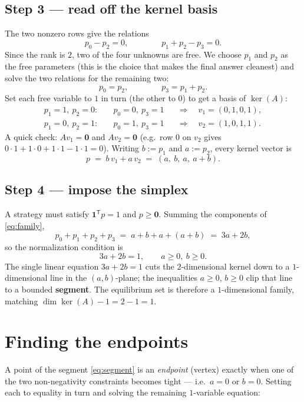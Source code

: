 \documentclass[11pt]{article}
\newcommand{\ones}{\mathbf{1}}
\newcommand{\zero}{\mathbf{0}}
\theoremstyle{plain}
\theoremstyle{definition}
\begin{document}
\subsection{Step 3 --- read off the kernel basis}

The two nonzero rows give the relations
\[
  p_0 - p_2 = 0,
  \qquad\qquad
  p_1 + p_2 - p_3 = 0.
\]
Since the rank is $2$, two of the four unknowns are free. We choose $p_1$ and $p_2$
as the free parameters (this is the choice that makes the final answer cleanest) and
solve the two relations for the remaining two:
\[
  p_0 = p_2,
  \qquad\qquad
  p_3 = p_1 + p_2.
\]
Set each free variable to $1$ in turn (the other to $0$) to get a basis of $\ker(A)$:
\[
  \begin{aligned}
    p_1=1,\ p_2=0:\quad & p_0=0,\ p_3=1 & &\Rightarrow\quad v_1=(0,1,0,1),\\
    p_1=0,\ p_2=1:\quad & p_0=1,\ p_3=1 & &\Rightarrow\quad v_2=(1,0,1,1).
  \end{aligned}
\]
A quick check: $A v_1 = \zero$ and $A v_2=\zero$ (e.g.\ row $0$ on $v_2$ gives
$0\cdot1+1\cdot0+1\cdot1-1\cdot1=0$). Writing $b:=p_1$ and $a:=p_2$, every kernel
vector is
\begin{equation}\label{eq:family}
  p \;=\; b\,v_1 + a\,v_2 \;=\; (a,\ b,\ a,\ a+b).
\end{equation}

\subsection{Step 4 --- impose the simplex}

A strategy must satisfy $\ones^{\mathsf T}p=1$ and $p\ge\zero$. Summing the
components of \eqref{eq:family},
\[
  p_0+p_1+p_2+p_3 \;=\; a + b + a + (a+b) \;=\; 3a + 2b ,
\]
so the normalization condition is
\begin{equation}\label{eq:segment}
  3a+2b=1, \qquad a\ge 0,\ b\ge 0 .
\end{equation}
The single linear equation $3a+2b=1$ cuts the $2$-dimensional kernel down to a
$1$-dimensional line in the $(a,b)$-plane; the inequalities $a\ge0$, $b\ge0$ clip
that line to a bounded \textbf{segment}. The equilibrium set is therefore a
$1$-dimensional family, matching $\dim\ker(A)-1 = 2-1 = 1$.

\section{Finding the endpoints}

A point of the segment \eqref{eq:segment} is an \emph{endpoint} (vertex) exactly when
one of the two non-negativity constraints becomes tight --- i.e.\ $a=0$ or $b=0$.
Setting each to equality in turn and solving the remaining $1$-variable equation:
\end{document}
